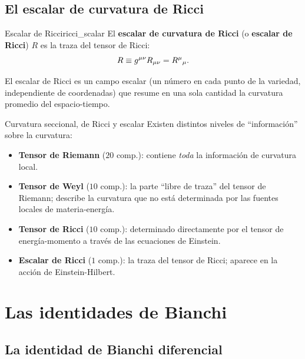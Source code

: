 \subsection{El escalar de curvatura de Ricci}

\begin{definicion}{Escalar de Ricci}{ricci_scalar}
El \textbf{escalar de curvatura de Ricci} (o \textbf{escalar de Ricci}) $R$ es la traza del tensor de Ricci:
\begin{equation}
  R \equiv g^{\mu\nu}R_{\mu\nu} = R^\mu{}_\mu.
  \label{eq:ricci_scalar}
\end{equation}
\end{definicion}

El escalar de Ricci es un campo escalar (un número en cada punto de la variedad, independiente de coordenadas) que resume en una sola cantidad la curvatura promedio del espacio-tiempo.

\begin{observacion}{Curvatura seccional, de Ricci y escalar}{}
Existen distintos niveles de ``información'' sobre la curvatura:
\begin{itemize}[leftmargin=2em]
  \item \textbf{Tensor de Riemann} ($20$ comp.): contiene \emph{toda} la información de curvatura local.
  \item \textbf{Tensor de Weyl} ($10$ comp.): la parte ``libre de traza'' del tensor de Riemann; describe la curvatura que no está determinada por las fuentes locales de materia-energía.
  \item \textbf{Tensor de Ricci} ($10$ comp.): determinado directamente por el tensor de energía-momento a través de las ecuaciones de Einstein.
  \item \textbf{Escalar de Ricci} ($1$ comp.): la traza del tensor de Ricci; aparece en la acción de Einstein-Hilbert.
\end{itemize}
\end{observacion}

\section{Las identidades de Bianchi}
\label{sec:bianchi}

\subsection{La identidad de Bianchi diferencial}

